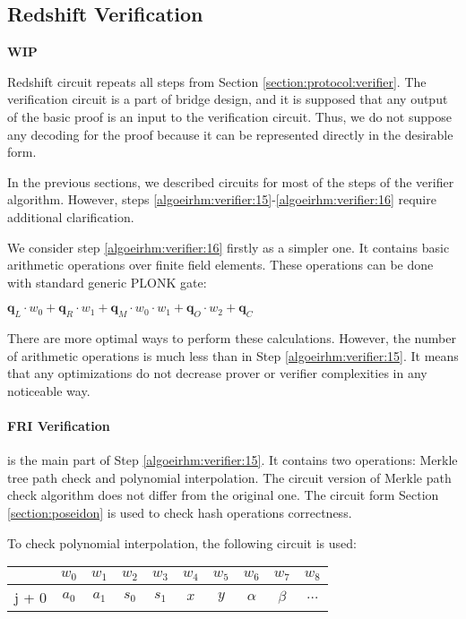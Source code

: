 \subsection{Redshift Verification}
\textbf{WIP}


Redshift circuit repeats all steps from Section \ref{section:protocol:verifier}.
The verification circuit is a part of bridge design, and it is supposed that any output of the basic proof is an input to the verification circuit. 
Thus, we do not suppose any decoding for the proof because it can be represented directly in the desirable form. 

In the previous sections, we described circuits for most of the steps of the verifier algorithm.
However, steps \ref{algoeirhm:verifier:15}-\ref{algoeirhm:verifier:16} require additional clarification.

We consider step \ref{algoeirhm:verifier:16} firstly as a simpler one.
It contains basic arithmetic operations over finite field elements. 
These operations can be done with standard generic PLONK gate:
\begin{center}
	$\textbf{q}_L \cdot w_0 + \textbf{q}_R \cdot w_1 + \textbf{q}_M \cdot w_0 \cdot w_1 + \textbf{q}_O \cdot w_2 + \textbf{q}_C$
\end{center}
There are more optimal ways to perform these calculations.
However, the number of arithmetic operations is much less than in  Step \ref{algoeirhm:verifier:15}.
It means that any optimizations do not decrease prover or verifier complexities in any noticeable way. 

\paragraph{FRI Verification} is the main part of Step \ref{algoeirhm:verifier:15}. 
It contains two operations: Merkle tree path check and polynomial interpolation. 
The circuit version of Merkle path check algorithm does not differ from the original one. 
The circuit form Section \ref{section:poseidon} is used to check hash operations correctness. 

To check polynomial interpolation, the following circuit is used:
\begin{center}
    \begin{tabular}{ c|c|c|c|c|c|c|c|c|c }
        & $w_0$  & $w_1$  & $w_2$  & $w_3$  & $w_4$  & $w_5$ & $w_6$ & $w_7$ & $w_8$  \\
        \hline
        j + 0  & $a_0$  & $a_1$ & $s_0$ & $s_1$ & $x$ & $y$ & $\alpha$ & $\beta$ & $\dots$   \\
    \end{tabular}
\end{center}

